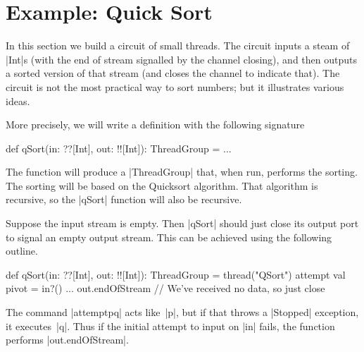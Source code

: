 \def\comp#1#2#3{%
  \draw (#1)+(#3,0) node {$\bullet$};
  \draw (#2)+(#3,0) node (n2) {$\bullet$};
  \draw[thick] (#1)+(#3,0) -- (n2.center);
}




\section{Example: Quick Sort}

In this section we build a circuit of small threads.  The circuit inputs a
steam of |Int|s (with the end of stream signalled by the channel closing), and
then outputs a sorted version of that stream (and closes the channel to
indicate that).  The circuit is not the most practical way to sort numbers;
but it illustrates various ideas.

More precisely, we will write a  definition with the following signature
%
\begin{scala}
  def qSort(in: ??[Int], out: !![Int]): ThreadGroup = ...
\end{scala}
%
The function will produce a |ThreadGroup| that, when run, performs the
sorting.  The sorting will be based on the Quicksort algorithm.  That
algorithm is recursive, so the |qSort| function will also be recursive.



Suppose the input stream is empty.  Then |qSort| should just close its output
port to signal an empty output stream.  This can be achieved using the
following outline.
%
\begin{scala}
  def qSort(in: ??[Int], out: !![Int]): ThreadGroup = thread("QSort"){
    attempt{
      val pivot = in?()
      ...
    }{
      out.endOfStream // We've received no data, so just close
    }
  }
\end{scala}
%
The command |attempt{p}{q}| acts like~|p|, but if that throws a |Stopped|
exception, it executes~|q|.  Thus if the initial attempt to input on |in|
fails, the function performs |out.endOfStream|.

